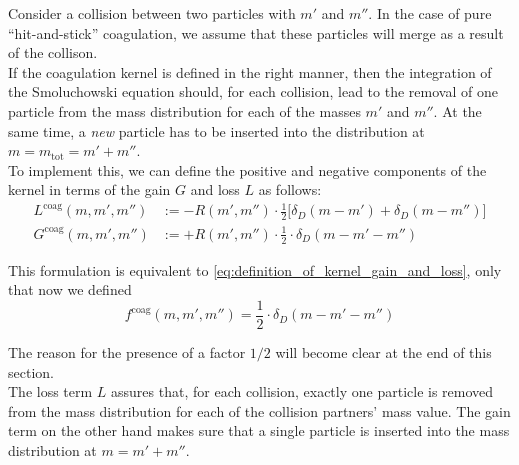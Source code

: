 
    Consider a collision between two particles with $m'$ and $m''$. 
    In the case of pure ``hit-and-stick'' coagulation, 
    we assume that these particles will merge as a result of the collison. \\

    If the coagulation kernel is defined in the right manner, then the integration of 
    the Smoluchowski equation should, for each collision, lead to the removal of one 
    particle from the mass distribution for each of the masses $m'$ and $m''$. At the same 
    time, a \textit{new} particle has to be inserted into the distribution at 
    $m=m_\text{tot}=m'+m''$. \\

    To implement this, we can define the positive and negative 
    components of the kernel in terms of the gain $G$ and loss $L$ as follows:
    \begin{align}
        \label{eq:definition_of_coagulation_kernel_gain_and_loss}
        L^\text{coag}(m, m', m'') 
            &:= -R(m',m'') \cdot \frac{1}{2} \bigg[\delta_D(m-m')+\delta_D(m-m'')\bigg] \\
        G^\text{coag}(m, m', m'') 
            &:= +R(m',m'') \cdot \frac{1}{2} \cdot \delta_D(m-m'-m'')
    \end{align}

    This formulation is equivalent to \cref{eq:definition_of_kernel_gain_and_loss},
    only that now we defined 
    \begin{equation}
        \label{eq:definition_of_f_coag}
        f^\text{coag}(m,m',m'') = \frac{1}{2} \cdot \delta_D(m-m'-m'')
    \end{equation}

    The reason for the presence of a factor $1/2$ will become clear at the end of this 
    section. \\

    The loss term $L$ assures that, for each collision, exactly one particle is removed 
    from the mass distribution for each of the collision partners' mass value.
    The gain term on the other hand makes sure that a single particle is inserted into the 
    mass distribution at $m = m' + m''$. \\


